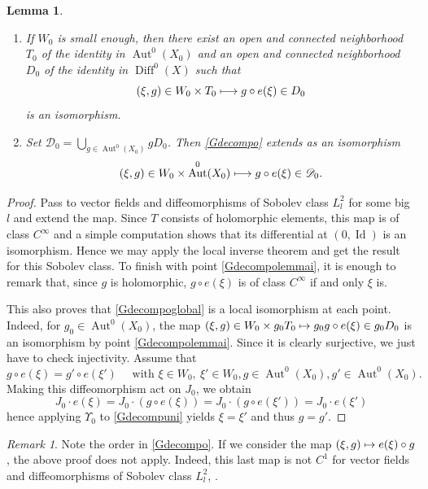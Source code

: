 \documentclass[10pt]{amsart}
\let\mathcal\mathscr
\def\mto{\mathchoice{\longmapsto}{\mapsto}{\mapsto}{\mapsto}}
\DeclareMathOperator{\Aut}{Aut}
\DeclareMathOperator{\Diff}{Diff}
\DeclareMathOperator{\Id}{Id}
\theoremstyle{plain}
\newtheorem{lemma}[theorem]{Lemma}
\theoremstyle{definition}
\theoremstyle{remark}
\newtheorem{remark}[theorem]{Remark}
\numberwithin{equation}{section}
\newcommand{\Azero}{\Aut^0(X_0)}
\providecommand{\skpt}{\par\smallskip\noindent}
\begin{document}
\skpt
\begin{lemma}
\label{Gdecompolemma}
\begin{enumerate}
\item\label{Gdecompolemmai}
If $W_0$ is small enough, then there exist an open and connected neighborhood~$T_0$ of the identity in $\Aut^0(X_0)$ and an open and connected neighborhood $D_0$ of the identity in $\Diff^0(X)$ such that
\begin{equation}
\label{Gdecompo}
(\xi,g)\in W_0\times T_0\mto g\circ e(\xi)\in D_0
\end{equation}
is an isomorphism.
\item\label{Gdecompolemmaii}
Set $\mathcal D_0=\bigcup_{g\in \Aut^0(X_0)}gD_0$. Then \eqref{Gdecompo} extends as an isomorphism
\begin{equation}
\label{Gdecompoglobal}
(\xi,g)\in W_0\times \Aut^0(X_0)\mto g\circ e(\xi)\in \mathcal D_0.
\end{equation}
\end{enumerate}
\end{lemma}

\begin{proof}
Pass to vector fields and diffeomorphisms of Sobolev class $L^2_l$ for some big~$l$ and extend the map. Since $T$ consists of holomorphic elements, this map is of class $C^\infty$ and a simple computation shows that its differential at $(0, \Id)$ is an isomorphism. Hence we may apply the local inverse theorem and get the result for this Sobolev class. To finish with point \eqref{Gdecompolemmai}, it is enough to remark that, since $g$ is holomorphic, $g\circ e(\xi)$ is of class $C^\infty$ if and only $\xi$ is.

This also proves that \eqref{Gdecompoglobal} is a local isomorphism at each point. Indeed, for $g_0\in \Azero$, the map $(\xi, g)\in W_0\times g_0T_0\mto g_0g\circ e(\xi)\in g_0D_0$ is an isomorphism by point \eqref{Gdecompolemmai}. Since it is clearly surjective, we just have to check injectivity. Assume that
\[
g\circ e(\xi)=g'\circ e(\xi')\quad\text{ with }\xi\in W_0,\ \xi'\in W_0, g\in \Aut^0(X_0), g'\in \Aut^0(X_0).
\]
Making this diffeomorphism act on $J_0$, we obtain
\begin{equation}
\label{Gdecompuni}
J_0\cdot e(\xi)=J_0\cdot (g\circ e(\xi))=J_0\cdot (g\circ e(\xi'))=J_0\cdot e(\xi')
\end{equation}
hence applying $\Upsilon_0$ to \eqref{Gdecompuni} yields $\xi=\xi'$ and thus $g=g'$.
\end{proof}
\begin{remark}
\label{noncommutatif}
Note the order in \eqref{Gdecompo}. If we consider the map $(\xi,g)\mto e(\xi)\circ g$, the above proof does not apply. Indeed, this last map is not $C^1$ for vector fields and diffeomorphisms of Sobolev class $L^2_l$, \cf \cite[Ex.\,I.4.4.5]{Hamilton}.
\end{remark}
\end{document}
